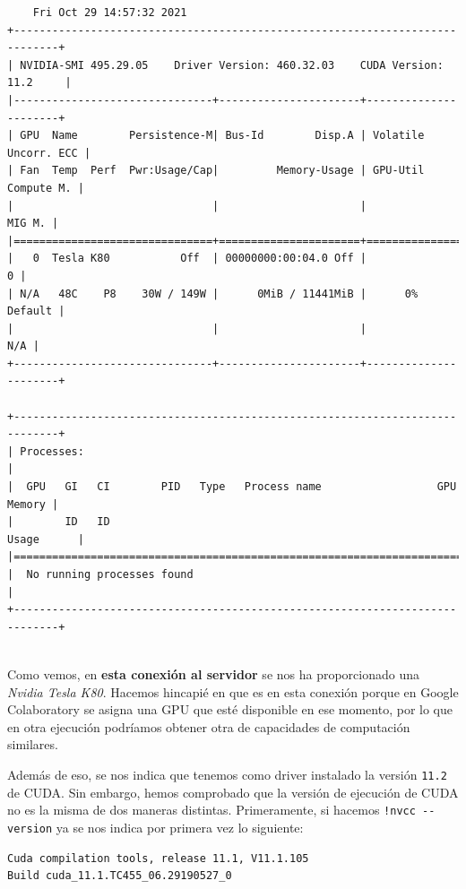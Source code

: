 \documentclass[11pt]{article}
\def\inline{\lstinline[basicstyle=\ttfamily,keywordstyle={}]}
\begin{document}
\begin{minipage}{0.7\textwidth}

\begin{verbatim}
	Fri Oct 29 14:57:32 2021       
+-----------------------------------------------------------------------------+
| NVIDIA-SMI 495.29.05    Driver Version: 460.32.03    CUDA Version: 11.2     |
|-------------------------------+----------------------+----------------------+
| GPU  Name        Persistence-M| Bus-Id        Disp.A | Volatile Uncorr. ECC |
| Fan  Temp  Perf  Pwr:Usage/Cap|         Memory-Usage | GPU-Util  Compute M. |
|                               |                      |               MIG M. |
|===============================+======================+======================|
|   0  Tesla K80           Off  | 00000000:00:04.0 Off |                    0 |
| N/A   48C    P8    30W / 149W |      0MiB / 11441MiB |      0%      Default |
|                               |                      |                  N/A |
+-------------------------------+----------------------+----------------------+
                                                                               
+-----------------------------------------------------------------------------+
| Processes:                                                                  |
|  GPU   GI   CI        PID   Type   Process name                  GPU Memory |
|        ID   ID                                                   Usage      |
|=============================================================================|
|  No running processes found                                                 |
+-----------------------------------------------------------------------------+
\end{verbatim}
\end{minipage}\\
Como vemos, en \textbf{esta conexión al servidor} se nos ha proporcionado una \emph{Nvidia Tesla K80}. Hacemos hincapié en que es en esta conexión porque en Google Colaboratory se asigna una GPU que esté disponible en ese momento, por lo que en otra ejecución podríamos obtener otra de capacidades de computación similares.

Además de eso, se nos indica que tenemos como driver instalado la versión \inline{11.2} de CUDA. Sin embargo, hemos comprobado que la versión de ejecución de CUDA no es la misma de dos maneras distintas. Primeramente, si hacemos \lstinline{!nvcc --version} ya se nos indica por primera vez lo siguiente:
\begin{verbatim}
Cuda compilation tools, release 11.1, V11.1.105
Build cuda_11.1.TC455_06.29190527_0
\end{verbatim}
\end{document}
